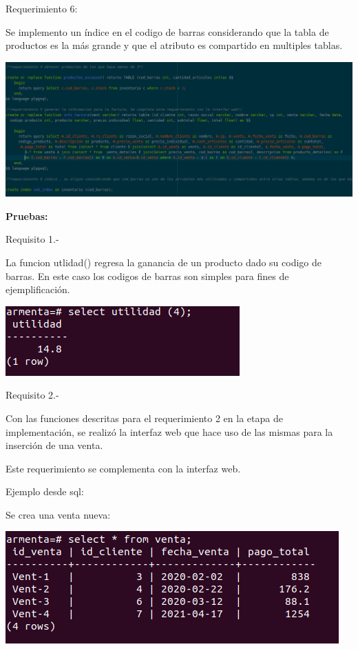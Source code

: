 \documentclass[12pt, letterpaper]{article}     %
\begin{document}
	Requerimiento 6:
	
	Se implemento un índice en el codigo de barras considerando que la tabla de productos es la más grande y que el atributo es compartido en multiples tablas.
	
		
	\begin{center}
   	\includegraphics[scale=0.35]{req456}
	\end{center}
	
		\vspace{5mm} %

		\textbf{Pruebas:}
		\vspace{5mm} %

		
		Requisito 1.-
		
		La funcion utlidad() regresa la ganancia de un producto dado su codigo de barras. En este caso los codigos de barras son simples para fines de ejemplificación.
		
		\begin{center}
 	  	\includegraphics[scale=0.75]{utlidad_function}
		\end{center}
		
		Requisito 2.-
		
		Con las funciones descritas para el requerimiento 2 en la etapa de implementación, se realizó la interfaz web que hace uso de las mismas para la inserción de una venta.
		
		Este requerimiento se complementa con la interfaz web.
		
		
		Ejemplo desde sql:
		
		Se crea una venta nueva:
		
				
		
		\begin{center}
 	  	\includegraphics[scale=0.5]{venta_prev}
		\end{center}
		
\end{document}
